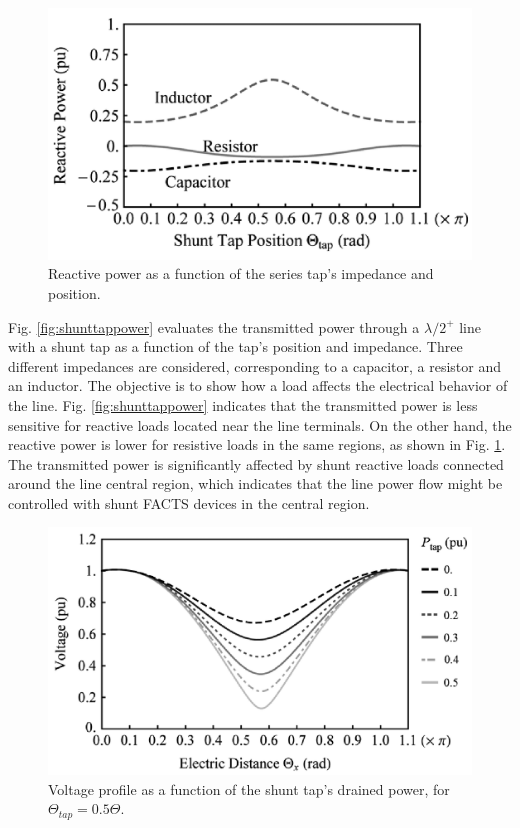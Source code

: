 \documentclass[12pt,a4paper]{reportmod}
\begin{document}
\begin{figure}[h]
\label{fig:shunttaprepower}
\begin{center}
\includegraphics[scale=0.3]{shunttaprepower.png}
\caption{Reactive power as a function of the series tap’s impedance and position.}
\end{center}
\end{figure}
\par Fig. \ref{fig:shunttappower} evaluates the transmitted power through a $\lambda /2^+$ line with a shunt tap as a function of the tap’s position and impedance. Three different impedances are considered, corresponding to a capacitor, a resistor and an inductor. The objective is to show how a load affects the electrical behavior of the line. Fig. \ref{fig:shunttappower} indicates that the transmitted power is less sensitive for reactive loads located near the line terminals. On the other hand, the reactive power is lower for resistive loads in the same regions, as shown in Fig. \ref{fig:shunttaprepower}. The transmitted power is significantly affected by shunt reactive loads connected around the line central region, which indicates that the line power flow might be controlled with shunt FACTS devices in the central region.
\begin{figure}[h]
\label{fig:shunttapvpdp}
\begin{center}
\includegraphics[scale=0.3]{shunttapvpdp.png}
\caption{Voltage profile as a function of the shunt tap’s drained power, for $\Theta_{tap}=0.5\Theta$.}
\end{center}
\end{figure}
\end{document}
